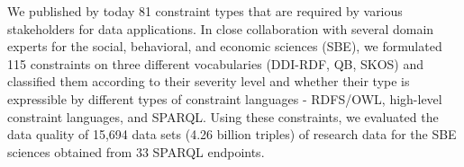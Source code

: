 \documentclass[conference]{IEEEtran}
\begin{document}


We published by today 81 constraint types that are required by various stakeholders for data applications.
In close collaboration with several domain experts for the social, behavioral, and economic sciences (SBE), we formulated 115 constraints on three different vocabularies (DDI-RDF, QB, SKOS) and classified them according to their severity level and  whether their type is expressible by different types of constraint languages - RDFS/OWL, high-level constraint languages, and SPARQL. 
Using these constraints, we evaluated  the data quality of 15,694 data sets (4.26 billion triples) of research data for the SBE sciences obtained from 33 SPARQL endpoints.
\end{document}
